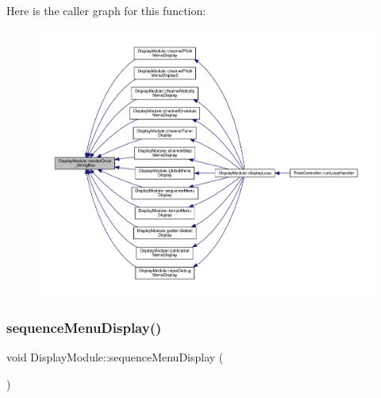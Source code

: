 Here is the caller graph for this function\+:
\nopagebreak
\begin{figure}[H]
\begin{center}
\leavevmode
\includegraphics[width=350pt]{class_display_module_a453ceefb9e2a9a82dd7b62825cc2cac8_icgraph}
\end{center}
\end{figure}
\mbox{\label{class_display_module_a3e2fc0a60ef41f41e57d463faf59bd2b}} 
\subsubsection{\texorpdfstring{sequence\+Menu\+Display()}{sequenceMenuDisplay()}}
{\footnotesize\ttfamily void Display\+Module\+::sequence\+Menu\+Display (\begin{DoxyParamCaption}{ }\end{DoxyParamCaption})}

